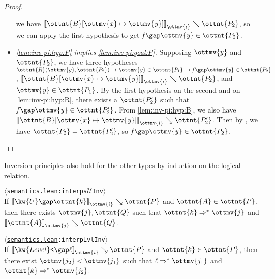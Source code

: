 \documentclass[a4paper,UKenglish,cleveref,autoref,thm-restate]{lipics-v2021}
\newcommand{\repo}{https://github.com/ionathanch/TTBFL}
\newcommand{\thmref}[2]{%
  $\langle$\href{\repo/tree/main/src/#1}{\texttt{#1}}\texttt{:#2}$\rangle$%
}
\begin{document}
\begin{proof}
\begin{itemize}[topsep=0pt]
      we have $ \mathopen{\llbracket}   \ottnt{B} [  \ottmv{x}  \mapsto   \mathit{ \ottmv{y} }   ]   \mathclose{\rrbracket}_{ \ottmv{i} } \searrow  \ottnt{P_{{\mathrm{2}}}} $,
      so we can apply the first hypothesis to get $   \mathit{ f }   \gap   \mathit{ \ottmv{y} }    \in  \ottnt{P_{{\mathrm{2}}}} $.
    \item \textit{\ref{lem:inv-pi:hyp:P} implies \ref{lem:inv-pi:goal:P}.}
      Supposing $\ottmv{y}$ and $\ottnt{P_{{\mathrm{2}}}}$,
      we have three hypotheses $  \ottnt{R} ( \ottmv{y} ,  \ottnt{P_{{\mathrm{2}}}} )   \to     \mathit{ \ottmv{y} }   \in  \ottnt{P_{{\mathrm{1}}}}   \to     \mathit{ f }   \gap   \mathit{ \ottmv{y} }    \in  \ottnt{P_{{\mathrm{2}}}}   $,
      $ \mathopen{\llbracket}   \ottnt{B} [  \ottmv{x}  \mapsto   \mathit{ \ottmv{y} }   ]   \mathclose{\rrbracket}_{ \ottmv{i} } \searrow  \ottnt{P_{{\mathrm{2}}}} $, and $  \mathit{ \ottmv{y} }   \in  \ottnt{P_{{\mathrm{1}}}} $.
      By the first hypothesis on the second and on \ref{lem:inv-pi:hyp:R},
      there exists a $\ottnt{P'_{{\mathrm{2}}}}$ such that $   \mathit{ f }   \gap   \mathit{ \ottmv{y} }    \in  \ottnt{P'_{{\mathrm{2}}}} $.
      From \ref{lem:inv-pi:hyp:B}, we also have $ \mathopen{\llbracket}   \ottnt{B} [  \ottmv{x}  \mapsto   \mathit{ \ottmv{y} }   ]   \mathclose{\rrbracket}_{ \ottmv{i} } \searrow  \ottnt{P'_{{\mathrm{2}}}} $.
      Then by , we have $\ottnt{P_{{\mathrm{2}}}} = \ottnt{P'_{{\mathrm{2}}}}$, so $   \mathit{ f }   \gap   \mathit{ \ottmv{y} }    \in  \ottnt{P_{{\mathrm{2}}}} $.
      \qedhere
  \end{itemize}
\end{proof}

Inversion principles also hold for the other types
by induction on the logical relation.

\begin{lemma} \thmref{semantics.lean}{interps$\mathcal{U}$Inv} \label{lem:lr:inv-univ} \\
  If $ \mathopen{\llbracket}   \kw{U} \gap  \ottnt{k}   \mathclose{\rrbracket}_{ \ottmv{i} } \searrow  \ottnt{P} $ and $ \ottnt{A}  \in  \ottnt{P} $,
  then there exists $\ottmv{j}, \ottnt{Q}$ such that $ \ottnt{k}  \Rightarrow^\ast   \ottmv{j}  $ and $ \mathopen{\llbracket}  \ottnt{A}  \mathclose{\rrbracket}_{ \ottmv{j} } \searrow  \ottnt{Q} $.
\end{lemma}

\begin{lemma} \thmref{semantics.lean}{interpLvlInv} \label{lem:lr:inv-lvl} \\
  If $ \mathopen{\llbracket}   \kw{Level}\texttt{<} \gap  \ell   \mathclose{\rrbracket}_{ \ottmv{i} } \searrow  \ottnt{P} $ and $ \ottnt{k}  \in  \ottnt{P} $,
  then there exist $\ottmv{j_{{\mathrm{2}}}} < \ottmv{j_{{\mathrm{1}}}}$ such that $ \ell  \Rightarrow^\ast   \ottmv{j_{{\mathrm{1}}}}  $ and $ \ottnt{k}  \Rightarrow^\ast   \ottmv{j_{{\mathrm{2}}}}  $.
\end{lemma}
\end{document}
